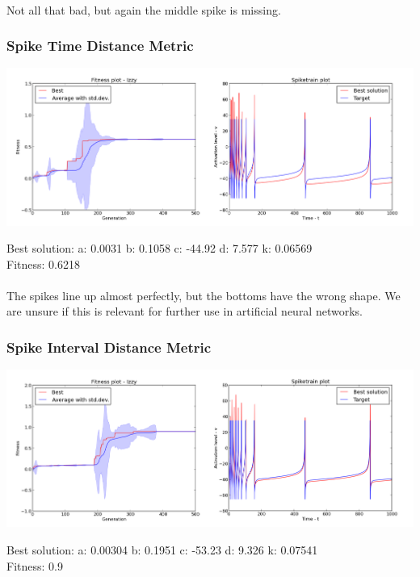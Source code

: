 \documentclass[a4paper,12pt]{article}
\begin{document}
\paragraph{}Not all that bad, but again the middle spike is missing.

\subsubsection{Spike Time Distance Metric}
\centerline{\includegraphics[width=1.0\textwidth]{img/case4_time}}
Best solution: 
a: 0.0031 
b: 0.1058 
c: -44.92 
d: 7.577 
k: 0.06569 \\
Fitness: 0.6218
\paragraph{}The spikes line up almost perfectly, but the bottoms have the wrong shape. We are unsure if this is relevant for further use in artificial neural networks.

\subsubsection{Spike Interval Distance Metric}
\centerline{\includegraphics[width=1.0\textwidth]{img/case4_int}}
Best solution: 
a: 0.00304 
b: 0.1951 
c: -53.23 
d: 9.326 
k: 0.07541 \\
Fitness: 0.9
\end{document}
